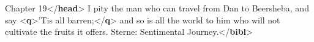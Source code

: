 \begin{shaded}
Chapter 19{</\textbf{head}>}\mbox{}\newline 
{}\mbox{}\newline 
\hspace*{1em}\mbox{}\newline 
\hspace*{1em}\hspace*{1em}I pity the man who can travel\mbox{}\newline 
\hspace*{1em}\hspace*{1em}\hspace*{1em}\hspace*{1em}\hspace*{1em}\hspace*{1em} from Dan to Beersheba, and say {<\textbf{q}>}'Tis all\mbox{}\newline 
\hspace*{1em}\hspace*{1em}\hspace*{1em}\hspace*{1em}\hspace*{1em}\hspace*{1em}\hspace*{1em}\hspace*{1em} barren;{</\textbf{q}>} and so is all the world to him\mbox{}\newline 
\hspace*{1em}\hspace*{1em}\hspace*{1em}\hspace*{1em}\hspace*{1em}\hspace*{1em} who will not cultivate the fruits it offers.\mbox{}\newline 
\hspace*{1em}\hspace*{1em}\mbox{}\newline 
\hspace*{1em}\hspace*{1em}Sterne: Sentimental Journey.{</\textbf{bibl}>}\mbox{}\newline 

\end{shaded}
